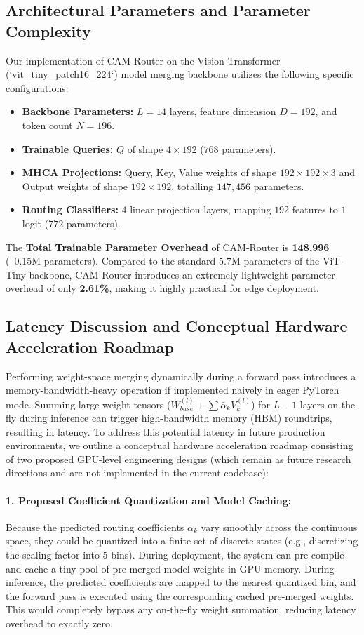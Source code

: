 \subsection{Architectural Parameters and Parameter Complexity}
Our implementation of CAM-Router on the Vision Transformer (`vit\_tiny\_patch16\_224`) model merging backbone utilizes the following specific configurations:
\begin{itemize}
    \item \textbf{Backbone Parameters:} $L = 14$ layers, feature dimension $D = 192$, and token count $N = 196$.
    \item \textbf{Trainable Queries:} $Q$ of shape $4 \times 192$ ($768$ parameters).
    \item \textbf{MHCA Projections:} Query, Key, Value weights of shape $192 \times 192 \times 3$ and Output weights of shape $192 \times 192$, totalling $147,456$ parameters.
    \item \textbf{Routing Classifiers:} $4$ linear projection layers, mapping $192$ features to $1$ logit ($772$ parameters).
\end{itemize}
The \textbf{Total Trainable Parameter Overhead} of CAM-Router is \textbf{148,996} (~0.15M parameters). Compared to the standard $5.7\text{M}$ parameters of the ViT-Tiny backbone, CAM-Router introduces an extremely lightweight parameter overhead of only \textbf{2.61\%}, making it highly practical for edge deployment.

\subsection{Latency Discussion and Conceptual Hardware Acceleration Roadmap}
Performing weight-space merging dynamically during a forward pass introduces a memory-bandwidth-heavy operation if implemented naively in eager PyTorch mode. Summing large weight tensors ($W_{base}^{(l)} + \sum \bar{\alpha}_k V_k^{(l)}$) for $L-1$ layers on-the-fly during inference can trigger high-bandwidth memory (HBM) roundtrips, resulting in latency. To address this potential latency in future production environments, we outline a conceptual hardware acceleration roadmap consisting of two proposed GPU-level engineering designs (which remain as future research directions and are not implemented in the current codebase):

\paragraph{1. Proposed Coefficient Quantization and Model Caching:}
Because the predicted routing coefficients $\alpha_k$ vary smoothly across the continuous space, they could be quantized into a finite set of discrete states (e.g., discretizing the scaling factor into $5$ bins). During deployment, the system can pre-compile and cache a tiny pool of pre-merged model weights in GPU memory. During inference, the predicted coefficients are mapped to the nearest quantized bin, and the forward pass is executed using the corresponding cached pre-merged weights. This would completely bypass any on-the-fly weight summation, reducing latency overhead to exactly zero.

